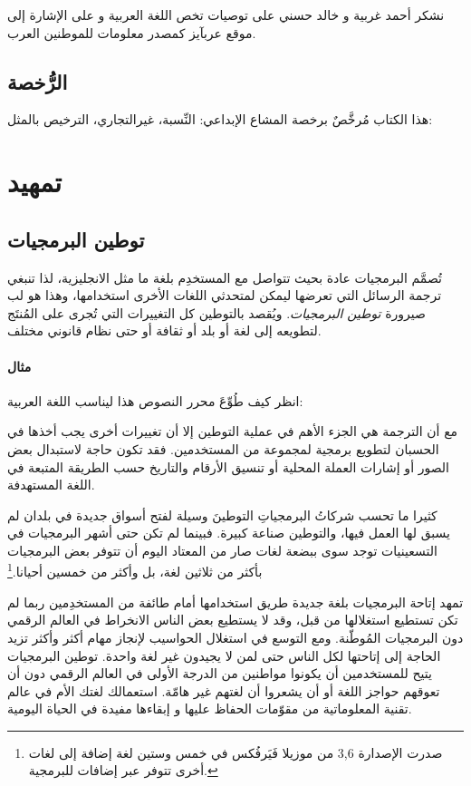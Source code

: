 
نشكر أحمد غربية و خالد حسني على توصيات تخص اللغة العربية و على الإشارة
إلى موقع عربآيز
 كمصدر
معلومات للموطنين العرب.

\section{الرُّخصة}
هذا الكتاب مُرخَّصٌ برخصة المشاع الإبداعي: النِّسبة، غيرالتجاري، الترخيص
بالمثل:


\chapter{تمهيد}
\section{توطين البرمجيات}
تُصمَّم البرمجيات عادة بحيث تتواصل مع المستخدِم بلغة ما مثل الانجليزية،
لذا تنبغي ترجمة الرسائل التي تعرضها ليمكن لمتحدثي اللغات الأخرى
استخدامها، وهذا هو لب صيرورة {\it توطين البرمجيات}. ويُقصد بالتوطين كل
التغييرات التي تُجرى على المُنتَج لتطويعه إلى لغة أو بلد أو ثقافة أو
حتى نظام قانوني مختلف.

\subsubsection{مثال}
انظر كيف طُوِّعَ محرر النصوص هذا ليناسب اللغة العربية:



مع أن الترجمة هي الجزء الأهم في عملية التوطين إلا أن تغييرات أخرى يجب
أخذها في الحسبان لتطويع برمجية لمجموعة من المستخدمين. فقد تكون حاجة
لاستبدال بعض الصور أو إشارات العملة المحلية أو تنسيق الأرقام والتاريخ
حسب الطريقة المتبعة في اللغة المستهدفة.

كثيرا ما تحسب شركاتُ البرمجياتِ التوطينَ وسيلة لفتح أسواق جديدة في بلدان
لم يسبق لها العمل فيها، والتوطين صناعة كبيرة. فبينما لم تكن حتى أشهر
البرمجيات في التسعينيات توجد سوى ببضعة لغات صار من المعتاد اليوم أن
تتوفر بعض البرمجيات بأكثر من ثلاثين لغة، بل وأكثر من خمسين
أحيانا.\footnote{صدرت الإصدارة 3,6 من موزيلا فَيَرفُكس في خمس وستين لغة
إضافة إلى لغات أخرى تتوفر عبر إضافات للبرمجية.}

تمهد إتاحة البرمجيات بلغة جديدة طريق استخدامها أمام طائفة من المستخدِمين
ربما لم تكن تستطيع استغلالها من قبل، وقد لا يستطيع بعض الناس الانخراط
في العالم الرقمي دون البرمجيات المُوطّنة. ومع التوسع في استغلال
الحواسيب لإنجاز مهام أكثر وأكثر تزيد الحاجة إلى إتاحتها لكل الناس حتى
لمن لا يجيدون غير لغة واحدة. توطين البرمجيات يتيح للمستخدمين أن يكونوا
مواطنين من الدرجة الأولى في العالم الرقمي دون أن تعوقهم حواجز اللغة أو
أن يشعروا أن لغتهم غير هامّة. استعمالك لغتك الأم في عالم تقنية
المعلوماتية من مقوّمات الحفاظ عليها و إبقاءها مفيدة في الحياة اليومية.

